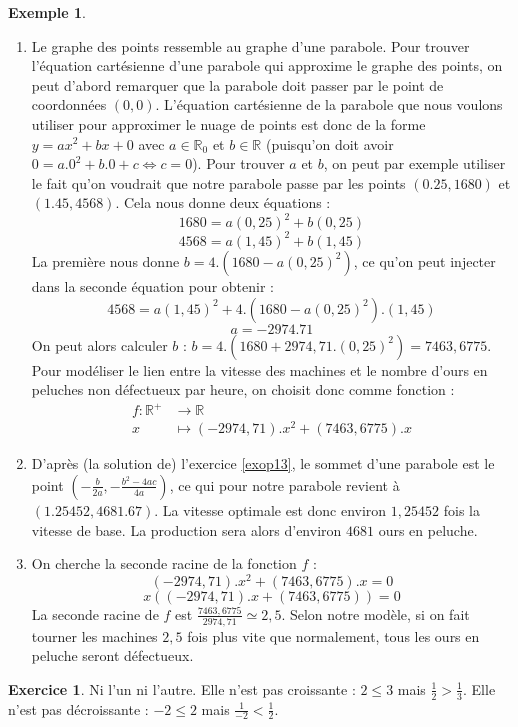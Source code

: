 \documentclass[a4paper,13pt]{scrreprt}
\theoremstyle{plain}
\theoremstyle{definition}
\newtheorem{exe}[subsection]{Exemple}
\newtheorem{exo}[subsection]{Exercice}
\newcommand{\rr}{\mathbb{R}}
\begin{document}
\begin{exe}
\begin{enumerate}
		\item Le graphe des points ressemble au graphe d'une parabole. Pour trouver l'équation cartésienne d'une parabole qui approxime le graphe des points, on peut d'abord remarquer que la parabole doit passer par le point de coordonnées $(0,0)$. L'équation cartésienne de la parabole que nous voulons utiliser pour approximer le nuage de points est donc de la forme $y=ax^2 +bx + 0$ avec $a \in {\rr}_{0}$ et $b\in \rr$ (puisqu'on doit avoir $0=a.0^2 + b.0 + c \Leftrightarrow c=0$). Pour trouver $a$ et $b$, on peut par exemple utiliser le fait qu'on voudrait que notre parabole passe par les points $(0.25,1680)$ et $(1.45,4568)$. Cela nous donne deux équations :
		$$1680 = a(0,25)^2 + b(0,25)$$
		$$4568=a(1,45)^2 + b(1,45)$$
		La première nous donne $b=4.(1680-a(0,25)^2)$, ce qu'on peut injecter dans la seconde équation pour obtenir :
		$$4568=a(1,45)^2 + 4.(1680-a(0,25)^2).(1,45)$$
		$$a=-2974.71$$
		On peut alors calculer $b$ : $b=4.(1680+2974,71.(0,25)^2)=7463,6775$. \\
		Pour modéliser le lien entre la vitesse des machines et le nombre d'ours en peluches non défectueux par heure, on choisit donc comme fonction :
		\begin{align*}
		f : {\rr}^{+} &\to \rr \\
		x &\mapsto (-2974,71).x^2 + (7463,6775).x
		\end{align*}
		\item D'après (la solution de) l'exercice \ref{exop13}, le sommet d'une parabole est le point $(-\frac{b}{2a},-\frac{b^2-4ac}{4a})$, ce qui pour notre parabole revient à $(1.25452, 4681.67)$. La vitesse optimale est donc environ $1,25452$ fois la vitesse de base. La production sera alors d'environ $4681$ ours en peluche.
		\item On cherche la seconde racine de la fonction $f$ :
		$$(-2974,71).x^2 + (7463,6775).x=0$$
		$$x((-2974,71).x + (7463,6775))=0$$
		La seconde racine de $f$ est $\frac{7463,6775}{2974,71} \simeq 2,5$. Selon notre modèle, si on fait tourner les machines $2,5$ fois plus vite que normalement, tous les ours en peluche seront défectueux.
	\end{enumerate}
\end{exe}

\begin{exo} Ni l'un ni l'autre. Elle n'est pas croissante : $2 \le 3$ mais $\frac{1}{2} > \frac{1}{3}$. Elle n'est pas décroissante : $-2 \le 2$ mais $\frac{1}{-2} < \frac{1}{2}$.
\end{exo}
\end{document}
